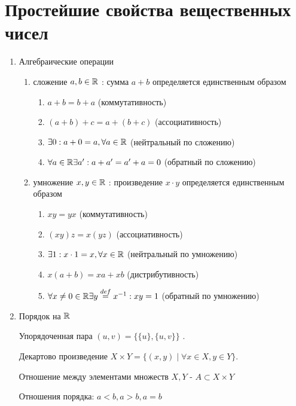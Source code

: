 \documentclass[12pt]{report}
\begin{document}
\section{Простейшие свойства вещественных чисел}
\begin{enumerate}
    \item Алгебраические операции
	\begin{enumerate}
	    \item сложение $a, b \in \R$ : сумма $a+b$ определяется единственным образом
		\begin{enumerate}
		    \item  $a+b = b+a$ (коммутативность)
		    \item  $(a+b)+c = a+(b+c)$ (ассоциативность)
		    \item  $\exists 0: a +0 = a, \forall a \in \R$ (нейтральный по сложению)
		    \item  $\forall a \in \R \exists a': a +a' = a' + a = 0 $ (обратный по сложению)
		\end{enumerate}
	    \item умножение $x,y \in \R$ : произведение $x\cdot y$ определяется единственным образом
		\begin{enumerate}
		    \item  $x y = y x$ (коммутативность)
		    \item  $(xy)z = x(yz)$ (ассоциативность)
		    \item  $\exists 1: x \cdot 1 = x, \forall x \in \R$ (нейтральный по умножению)
		    \item  $x(a+b) =xa + xb$ (дистрибутивность)
		    \item  $\forall x\ne 0 \in \R \exists y  \stackrel{def} = x^{-1}: xy = 1$ (обратный по умножению)
		\end{enumerate}
	\end{enumerate}
    \item Порядок на $\R$
	\begin{defn}
	    Упорядоченная пара $(u, v) = \{\{u\}, \{u, v\}\}$ .
	\end{defn}
	\begin{defn}
	    Декартово произведение $X \times Y = \{(x, y) \mid \forall x \in X, y \in Y\}$.
	\end{defn}
	\begin{defn}
	    Отношение между элементами множеств $X, Y$ - $A \subset X \times Y$
	\end{defn}
	Отношения порядка: $a < b, a>b, a=b$
	 \begin{enumerate}
	    \item $\forall a, b \in \R: \left [ 

\end{enumerate}
\end{enumerate}
\end{document}
